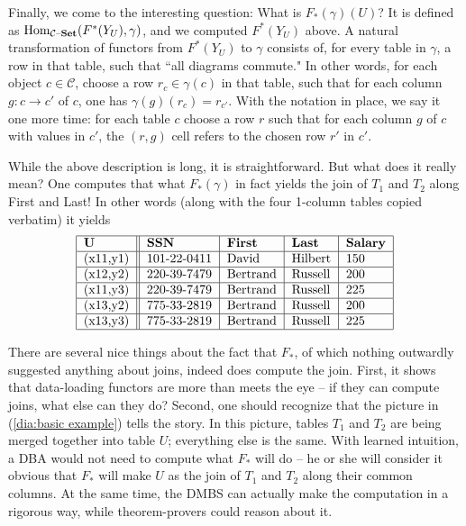 \documentclass{amsart}
\def\tn{\textnormal}
\def\mc{\mathcal}
\def\Hom{\tn{Hom}}
\def\to{\rightarrow}
\def\taking{\colon}
\def\set{{\text \textendash}{\bf Set}}
\def\mcC{\mc{C}}
\theoremstyle{remark}
\theoremstyle{definition}
\begin{document}
Finally, we come to the interesting question: What is $F_*(\gamma)(U)$?  It is defined as $\Hom_{\mcC\set}(F^*(Y_U),\gamma)$, and we computed $F^*(Y_U)$ above.  A natural transformation of functors from $F^*(Y_U)$ to $\gamma$ consists of, for every table in $\gamma$, a row in that table, such that ``all diagrams commute."  In other words, for each object $c\in\mcC$, choose a row $r_c\in\gamma(c)$ in that table, such that for each column $g\taking c\to c'$ of $c$, one has $\gamma(g)(r_c)=r_{c'}$.  With the notation in place, we say it one more time: for each table $c$ choose a row $r$ such that for each column $g$ of $c$ with values in $c'$, the $(r,g)$ cell refers to the chosen row $r'$ in $c'$.

While the above description is long, it is straightforward.  But what does it really mean?  One computes that what $F_*(\gamma)$ in fact yields the join of $T_1$ and $T_2$ along First and Last!  In other words (along with the four 1-column tables copied verbatim) it yields \begin{align*}\begin{tabular}{| l || l | l | l | l |}\hline {\bf U}&{\bf SSN}&{\bf First}&{\bf Last}&{\bf Salary}\\\hline (x11,y1)&101-22-0411&David&Hilbert&150\\\hline (x12,y2)&220-39-7479&Bertrand&Russell&200\\\hline (x11,y3)&220-39-7479&Bertrand&Russell&225\\\hline (x13,y2)&775-33-2819&Bertrand&Russell&200\\\hline (x13,y3)&775-33-2819&Bertrand&Russell&225\\\hline\end{tabular}\end{align*}

There are several nice things about the fact that $F_*$, of which nothing outwardly suggested anything about joins, indeed does compute the join.  First, it shows that data-loading functors are more than meets the eye -- if they can compute joins, what else can they do?  Second, one should recognize that the picture in (\ref{dia:basic example}) tells the story.  In this picture, tables $T_1$ and $T_2$ are being merged together into table $U$; everything else is the same.  With learned intuition, a DBA would not need to compute what $F_*$ will do -- he or she will consider it obvious that $F_*$ will make $U$ as the join of $T_1$ and $T_2$ along their common columns.  At the same time, the DMBS can actually make the computation in a rigorous way, while theorem-provers could reason about it.  
\end{document}
